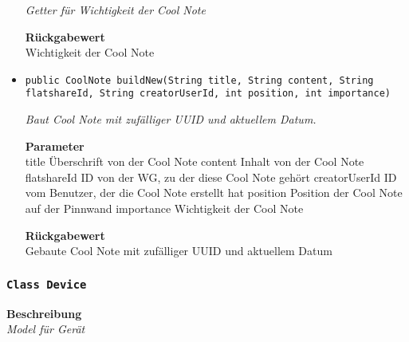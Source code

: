\begin{itemize}
    	\textit{Getter für Wichtigkeit der Cool Note}
    	
    	
    	
    	\textbf{Rückgabewert} \\
    	Wichtigkeit der Cool Note        \item{\texttt{public CoolNote buildNew(String title, String content, String flatshareId, String creatorUserId, int position, int importance)}}
    	
    	\textit{Baut Cool Note mit zufälliger UUID und aktuellem Datum.}
    	
    	\textbf{Parameter} \\
    	title Überschrift von der Cool Note
    	content Inhalt von der Cool Note
    	flatshareId ID von der WG, zu der diese Cool Note gehört
    	creatorUserId ID vom Benutzer, der die Cool Note erstellt hat
    	position Position der Cool Note auf der Pinnwand
    	importance Wichtigkeit der Cool Note
    	
    	\textbf{Rückgabewert} \\
    	Gebaute Cool Note mit zufälliger UUID und aktuellem Datum
    \end{itemize}
    \subsubsection{\texttt{Class Device}}
    \textbf{Beschreibung} \\
    \textit{Model für Gerät}
